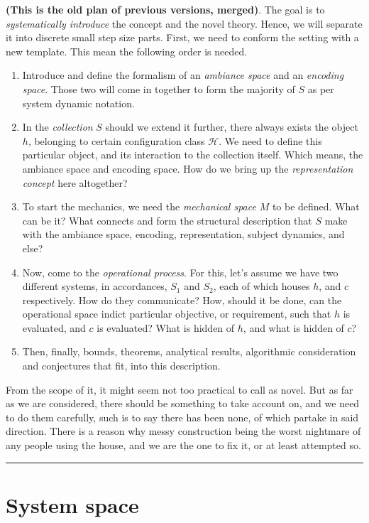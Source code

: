 \textbf{(This is the old plan of previous versions, merged)}. The goal is to \textit{systematically introduce} the concept and the novel theory. Hence, we will separate it into discrete small step size parts. First, we need to conform the setting with a new template. This mean the following order is needed. 
\begin{enumerate}[leftmargin=1cm,itemsep=2pt,topsep=2pt]
  \item Introduce and define the formalism of an \textit{ambiance space} and an \textit{encoding space}. Those two will come in together to form the majority of $S$ as per system dynamic notation. 
  \item In the \textit{collection} $S$ should we extend it further, there always exists the object $h$, belonging to certain configuration class $\mathcal{H}$. We need to define this particular object, and its interaction to the collection itself. Which means, the ambiance space and encoding space. How do we bring up the \textit{representation concept} here altogether? 
  \item To start the mechanics, we need the \textit{mechanical space} $M$ to be defined. What can be it? What connects and form the structural description that $S$ make with the ambiance space, encoding, representation, subject dynamics, and else? 
  \item Now, come to the \textit{operational process}. For this, let's assume we have two different systems, in accordances, $S_{1}$ and $S_{2}$, each of which houses $h$, and $c$ respectively. How do they communicate? How, should it be done, can the operational space indict particular objective, or requirement, such that $h$ is evaluated, and $c$ is evaluated? What is hidden of $h$, and what is hidden of $c$? 
  \item Then, finally, bounds, theorems, analytical results, algorithmic consideration and conjectures that fit, into this description. 
\end{enumerate}
From the scope of it, it might seem not too practical to call as novel. But as far as we are considered, there should be something to take account on, and we need to do them carefully, such is to say there has been none, of which partake in said direction. There is a reason why messy construction being the worst nightmare of any people using the house, and we are the one to fix it, or at least attempted so.

\noindent\rule{\linewidth}{1pt}

\section{System space}

